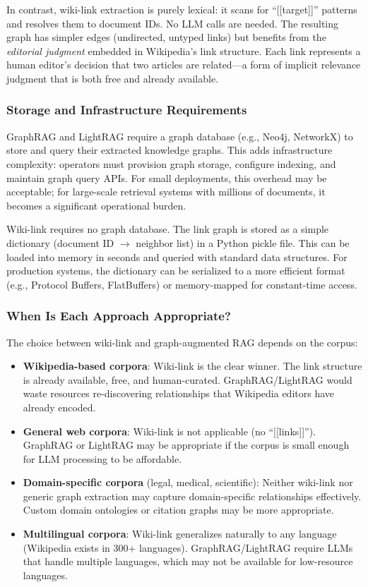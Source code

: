 \documentclass[sigconf,review]{acmart}
\begin{document}
In contrast, wiki-link extraction is purely lexical: it scans for
``[[target]]'' patterns and resolves them to document IDs. No LLM calls are
needed. The resulting graph has simpler edges (undirected, untyped links) but
benefits from the \emph{editorial judgment} embedded in Wikipedia's link
structure. Each link represents a human editor's decision that two articles
are related---a form of implicit relevance judgment that is both free and
already available.

\subsubsection{Storage and Infrastructure Requirements}
GraphRAG and LightRAG require a graph database (e.g., Neo4j, NetworkX) to
store and query their extracted knowledge graphs. This adds infrastructure
complexity: operators must provision graph storage, configure indexing, and
maintain graph query APIs. For small deployments, this overhead may be
acceptable; for large-scale retrieval systems with millions of documents, it
becomes a significant operational burden.

Wiki-link requires no graph database. The link graph is stored as a simple
dictionary (document ID $\to$ neighbor list) in a Python pickle file. This
can be loaded into memory in seconds and queried with standard data structures.
For production systems, the dictionary can be serialized to a more efficient
format (e.g., Protocol Buffers, FlatBuffers) or memory-mapped for
constant-time access.

\subsubsection{When Is Each Approach Appropriate?}
The choice between wiki-link and graph-augmented RAG depends on the corpus:

\begin{itemize}[leftmargin=*,nosep]
\item \textbf{Wikipedia-based corpora}: Wiki-link is the clear winner.
      The link structure is already available, free, and human-curated.
      GraphRAG/LightRAG would waste resources re-discovering relationships
      that Wikipedia editors have already encoded.
\item \textbf{General web corpora}: Wiki-link is not applicable (no
      ``[[links]]''). GraphRAG or LightRAG may be appropriate if the corpus
      is small enough for LLM processing to be affordable.
\item \textbf{Domain-specific corpora} (legal, medical, scientific): Neither
      wiki-link nor generic graph extraction may capture domain-specific
      relationships effectively. Custom domain ontologies or citation graphs
      may be more appropriate.
\item \textbf{Multilingual corpora}: Wiki-link generalizes naturally to any
      language (Wikipedia exists in 300+ languages). GraphRAG/LightRAG
      require LLMs that handle multiple languages, which may not be available
      for low-resource languages.
\end{itemize}
\end{document}
